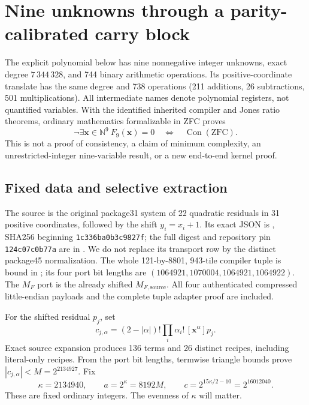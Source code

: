 \section{Nine unknowns through a parity-calibrated carry block}
\label{sec:nine-calibrated}
The explicit polynomial below has nine nonnegative integer unknowns,
exact degree \(7\,344\,328\), and 744 binary arithmetic operations.
Its positive-coordinate translate has the same degree and 738 operations
(211 additions, 26 subtractions, 501 multiplications).
All intermediate names denote polynomial registers, not quantified variables.
With the identified inherited compiler and Jones ratio theorems, ordinary
mathematics formalizable in ZFC proves
\[
  \neg\exists\mathbf x\in\mathbb N^9\ F_9(\mathbf x)=0
       \quad\Longleftrightarrow\quad\operatorname{Con}(\mathrm{ZFC}).
\]
This is not a proof of consistency, a claim of minimum complexity, an
unrestricted-integer nine-variable result, or a new end-to-end kernel proof.

\subsection{Fixed data and selective extraction}
The source is the original package31 system of 22 quadratic residuals in
31 positive coordinates, followed by the shift \(y_i=x_i+1\).
Its exact JSON is ,
SHA256 beginning \texttt{1c336ba0b3c9827f}; the full digest and repository
pin \texttt{124c07c0b77a} are in
.
We do not replace its transport row by the distinct package45 normalization.
The whole 121-by-8801, 943-tile compiler tuple is bound in
; its four port bit lengths are
\((1064921,1070004,1064921,1064922)\). The \(M_F\) port is the already
shifted \(M_{F,\mathrm{source}}\). All four authenticated compressed
little-endian payloads and the complete tuple adapter proof are included.

For the shifted residual \(p_j\), set
\[
 c_{j,\alpha}=(2-|\alpha|)!\prod_i\alpha_i!\,[\mathbf x^\alpha]p_j.
\]
Exact source expansion produces 136 terms and 26 distinct recipes,
including literal-only recipes. From the port bit lengths, termwise triangle
bounds prove \(|c_{j,\alpha}|<M=2^{2134927}\). Fix
\[
 \kappa=2134940,\qquad a=2^\kappa=8192M,\qquad
 c=2^{15\kappa/2-10}=2^{16012040}.
\]
These are fixed ordinary integers. The evenness of \(\kappa\) will matter.

